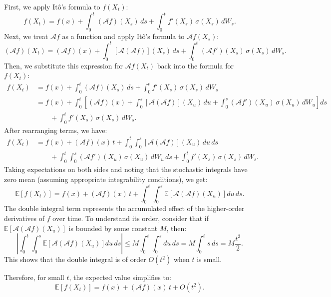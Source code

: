 \documentclass{article}[11]
\begin{document}
	First, we apply It\^{o}'s formula to \( f(X_t) \):
	\[
	f(X_t) = f(x) + \int_0^t (\mathcal{A} f)(X_s)\, ds + \int_0^t f'(X_s)\, \sigma(X_s)\, dW_s.
	\]
	Next, we treat \( \mathcal{A} f \) as a function and apply It\^{o}'s formula to \( \mathcal{A} f(X_s) \):
	\[
	(\mathcal{A} f)(X_t) = (\mathcal{A} f)(x) + \int_0^t [\mathcal{A} (\mathcal{A} f)](X_s)\, ds + \int_0^t (\mathcal{A} f')(X_s)\, \sigma(X_s)\, dW_s.
	\]
	Then, we substitute this expression for \( \mathcal{A} f(X_t) \) back into the formula for \( f(X_t) \):
	\[
	\begin{aligned}
		f(X_t) &= f(x) + \int_0^t (\mathcal{A} f)(X_s)\, ds + \int_0^t f'(X_s)\, \sigma(X_s)\, dW_s \\
		&= f(x) + \int_0^t \left[ (\mathcal{A} f)(x) + \int_0^s [\mathcal{A} (\mathcal{A} f)](X_u)\, du + \int_0^s (\mathcal{A} f')(X_u)\, \sigma(X_u)\, dW_u \right] ds \\
		&\qquad + \int_0^t f'(X_s)\, \sigma(X_s)\, dW_s.
	\end{aligned}
	\]
	After rearranging terms, we have:
	\[
	\begin{aligned}
		f(X_t) &= f(x) + (\mathcal{A} f)(x)\, t + \int_0^t \int_0^s [\mathcal{A} (\mathcal{A} f)](X_u)\, du\, ds \\
		&\qquad + \int_0^t \int_0^s (\mathcal{A} f')(X_u)\, \sigma(X_u)\, dW_u\, ds + \int_0^t f'(X_s)\, \sigma(X_s)\, dW_s.
	\end{aligned}
	\]
	Taking expectations on both sides and noting that the stochastic integrals have zero mean (assuming appropriate integrability conditions), we get:
	\[
	\mathbb{E}[f(X_t)] = f(x) + (\mathcal{A} f)(x)\, t + \int_0^t \int_0^s \mathbb{E}\left[ \mathcal{A} (\mathcal{A} f)(X_u) \right] du\, ds.
	\]
	The double integral term represents the accumulated effect of the higher-order derivatives of \( f \) over time. To understand its order, consider that if \( \mathbb{E}\left[ \mathcal{A} (\mathcal{A} f)(X_u) \right] \) is bounded by some constant \( M \), then:
	\[
	\left| \int_0^t \int_0^s \mathbb{E}\left[ \mathcal{A} (\mathcal{A} f)(X_u) \right] du\, ds \right| \leq M \int_0^t \int_0^s du\, ds = M \int_0^t s\, ds = M \frac{t^2}{2}.
	\]
	This shows that the double integral is of order \( O(t^2) \) when \( t \) is small.
	
	Therefore, for small \( t \), the expected value simplifies to:
	\begin{equation}\label{expansion_ot2}
		\mathbb{E}[f(X_t)] = f(x) + (\mathcal{A} f)(x)\, t + O(t^2).
	\end{equation}
	
	
	
	
	
	
	
\end{document}
